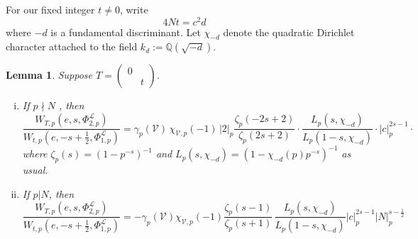\documentclass[reqno,oneside]{amsart}
\theoremstyle{plain}
\newtheorem{lemma}[theorem]{Lemma}
\theoremstyle{remark}
\numberwithin{theorem}{section}
\newcommand{\bbQ}{\mathbb Q}
\newcommand{\calL}{\mathcal L}
\newcommand{\calV}{\mathcal V}
\newcommand{\psm}[1]{\left( \begin{smallmatrix}#1 \end{smallmatrix} \right)}
\begin{document}
	For our fixed integer $t \neq 0$, write
	\begin{equation}
	4 Nt = c^2 d
	\end{equation}
	where $-d$ is a fundamental discriminant. Let $\chi_{-d}$ denote the quadratic Dirichlet character attached to the field $k_d := \bbQ(\sqrt{-d})$.
	
	\begin{lemma} \label{lem:Whittaker comparison local} Suppose  $T = \psm{0 & \\ & t}$.
		\begin{enumerate}[(i)]
			\item	If $p \nmid N$ , then
			\begin{equation}
			\frac{W_{T,p}(e, s, \Phi^{\calL}_{2,p})}{W_{t,p}(e, -s + \tfrac12, \Phi_{1,p}^{\calL})} =  \gamma_p(\calV) \, \chi_{\calV, p}(-1) \, |2|_p   \frac{ \zeta_p(-2s+2)}{\zeta_p(2s + 2)} \cdot \frac{ L_p(s, \chi_{-d})}{L_p(1-s, \chi_{-d})} \cdot |c|_p^{2s - 1} \cdot
			\end{equation}
			where $\zeta_p(s) = (1- p^{-s})^{-1}$ and $L_p(s, \chi_{-d}) = (1 - \chi_{-d}(p) p^{-s})^{-1}$ as usual.
			
			\item If $p|N$, then
			\begin{equation}
			\frac{W_{T,p}(e, s, \Phi^{\calL}_{2,p})}{W_{t,p}(e, -s + \tfrac12, \Phi_{1,p}^{\calL})} = - \gamma_p(\calV) \chi_{\calV,p}(-1) \frac{ \zeta_p(s-1)}{\zeta_p(s+1)} \, \frac{ L_p(s,\chi_{-d})}{L_p(1-s, \chi_{-d})} |c|_p^{2s-1} |N|_p^{s - \tfrac12}
			\end{equation}
		\end{enumerate}
	\end{lemma}
\end{document}
